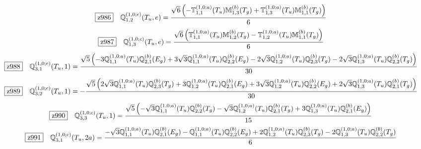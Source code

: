 \documentclass[fleqn,10pt,landscape]{jsarticle}
\begin{document}
\begin{dmath*}
\hspace*{3mm}\fbox{z986}\quad \mathbb{Q}_{1,2}^{(1,0;c)}(T_{u},e)=\frac{\sqrt{6} \left(- \mathbb{T}_{1,1}^{(1,0;a)}(T_{u}) \mathbb{M}_{1,3}^{(b)}(T_{g}) + \mathbb{T}_{1,3}^{(1,0;a)}(T_{u}) \mathbb{M}_{1,1}^{(b)}(T_{g})\right)}{6}
\end{dmath*}
\begin{dmath*}
\hspace*{3mm}\fbox{z987}\quad \mathbb{Q}_{1,3}^{(1,0;c)}(T_{u},e)=\frac{\sqrt{6} \left(\mathbb{T}_{1,1}^{(1,0;a)}(T_{u}) \mathbb{M}_{1,2}^{(b)}(T_{g}) - \mathbb{T}_{1,2}^{(1,0;a)}(T_{u}) \mathbb{M}_{1,1}^{(b)}(T_{g})\right)}{6}
\end{dmath*}
\begin{dmath*}
\hspace*{3mm}\fbox{z988}\quad \mathbb{Q}_{3,1}^{(1,0;c)}(T_{u},1)=\frac{\sqrt{5} \left(- 3 \mathbb{Q}_{1,1}^{(1,0;a)}(T_{u}) \mathbb{Q}_{2,1}^{(b)}(E_{g}) + 3 \sqrt{3} \mathbb{Q}_{1,1}^{(1,0;a)}(T_{u}) \mathbb{Q}_{2,2}^{(b)}(E_{g}) - 2 \sqrt{3} \mathbb{Q}_{1,2}^{(1,0;a)}(T_{u}) \mathbb{Q}_{2,3}^{(b)}(T_{g}) - 2 \sqrt{3} \mathbb{Q}_{1,3}^{(1,0;a)}(T_{u}) \mathbb{Q}_{2,2}^{(b)}(T_{g})\right)}{30}
\end{dmath*}
\begin{dmath*}
\hspace*{3mm}\fbox{z989}\quad \mathbb{Q}_{3,2}^{(1,0;c)}(T_{u},1)=- \frac{\sqrt{5} \left(2 \sqrt{3} \mathbb{Q}_{1,1}^{(1,0;a)}(T_{u}) \mathbb{Q}_{2,3}^{(b)}(T_{g}) + 3 \mathbb{Q}_{1,2}^{(1,0;a)}(T_{u}) \mathbb{Q}_{2,1}^{(b)}(E_{g}) + 3 \sqrt{3} \mathbb{Q}_{1,2}^{(1,0;a)}(T_{u}) \mathbb{Q}_{2,2}^{(b)}(E_{g}) + 2 \sqrt{3} \mathbb{Q}_{1,3}^{(1,0;a)}(T_{u}) \mathbb{Q}_{2,1}^{(b)}(T_{g})\right)}{30}
\end{dmath*}
\begin{dmath*}
\hspace*{3mm}\fbox{z990}\quad \mathbb{Q}_{3,3}^{(1,0;c)}(T_{u},1)=\frac{\sqrt{5} \left(- \sqrt{3} \mathbb{Q}_{1,1}^{(1,0;a)}(T_{u}) \mathbb{Q}_{2,2}^{(b)}(T_{g}) - \sqrt{3} \mathbb{Q}_{1,2}^{(1,0;a)}(T_{u}) \mathbb{Q}_{2,1}^{(b)}(T_{g}) + 3 \mathbb{Q}_{1,3}^{(1,0;a)}(T_{u}) \mathbb{Q}_{2,1}^{(b)}(E_{g})\right)}{15}
\end{dmath*}
\begin{dmath*}
\hspace*{3mm}\fbox{z991}\quad \mathbb{Q}_{3,1}^{(1,0;c)}(T_{u},2a)=\frac{- \sqrt{3} \mathbb{Q}_{1,1}^{(1,0;a)}(T_{u}) \mathbb{Q}_{2,1}^{(b)}(E_{g}) - \mathbb{Q}_{1,1}^{(1,0;a)}(T_{u}) \mathbb{Q}_{2,2}^{(b)}(E_{g}) + 2 \mathbb{Q}_{1,2}^{(1,0;a)}(T_{u}) \mathbb{Q}_{2,3}^{(b)}(T_{g}) - 2 \mathbb{Q}_{1,3}^{(1,0;a)}(T_{u}) \mathbb{Q}_{2,2}^{(b)}(T_{g})}{6}
\end{dmath*}
\end{document}

